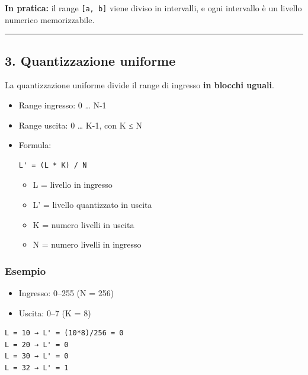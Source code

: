 \documentclass[
]{article}
\providecommand{\tightlist}{%
  \setlength{\itemsep}{0pt}\setlength{\parskip}{0pt}}
\begin{document}
\textbf{In pratica:} il range \texttt{{[}a,\ b{]}} viene diviso in intervalli, e ogni intervallo è un livello numerico memorizzabile.

\begin{center}\rule{0.5\linewidth}{0.5pt}\end{center}

\hypertarget{quantizzazione-uniforme}{%
\subsection{3. Quantizzazione uniforme}\label{quantizzazione-uniforme}}

La quantizzazione uniforme divide il range di ingresso \textbf{in blocchi uguali}.

\begin{itemize}
\item
  Range ingresso: 0 \ldots{} N-1
\item
  Range uscita: 0 \ldots{} K-1, con K ≤ N
\item
  Formula:

\begin{verbatim}
L' = (L * K) / N
\end{verbatim}

  \begin{itemize}
  \tightlist
  \item
    L = livello in ingresso
  \item
    L' = livello quantizzato in uscita
  \item
    K = numero livelli in uscita
  \item
    N = numero livelli in ingresso
  \end{itemize}
\end{itemize}

\hypertarget{esempio}{%
\subsubsection{Esempio}\label{esempio}}

\begin{itemize}
\tightlist
\item
  Ingresso: 0--255 (N = 256)
\item
  Uscita: 0--7 (K = 8)
\end{itemize}

\begin{verbatim}
L = 10 → L' = (10*8)/256 = 0
L = 20 → L' = 0
L = 30 → L' = 0
L = 32 → L' = 1
\end{verbatim}
\end{document}
